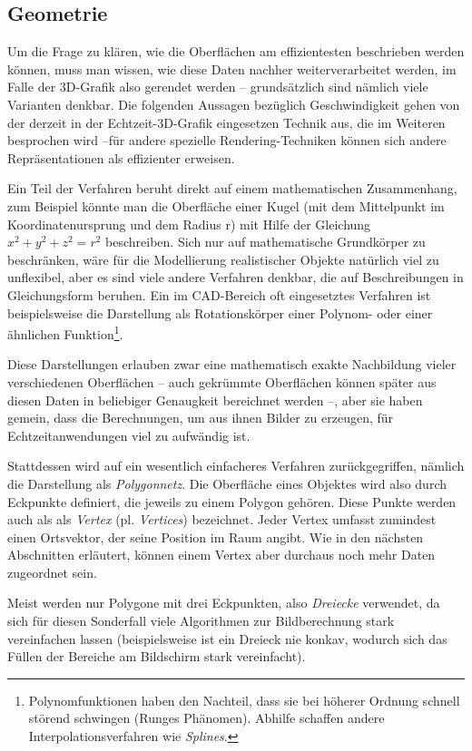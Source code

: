 \subsection{Geometrie}
\label{vertex}
Um die Frage zu klären, wie die Oberflächen am effizientesten beschrieben werden können, muss man wissen, wie diese Daten nachher weiterverarbeitet werden, im Falle der 3D-Grafik also gerendet werden -- grundsätzlich sind nämlich viele Varianten denkbar. Die folgenden Aussagen bezüglich Geschwindigkeit gehen von der derzeit in der Echtzeit-3D-Grafik eingesetzen Technik aus, die im Weiteren besprochen wird --für andere spezielle Rendering-Techniken können sich andere Repräsentationen als effizienter erweisen.

Ein Teil der Verfahren beruht direkt auf einem mathematischen Zusammenhang, zum Beispiel könnte man die Oberfläche einer Kugel (mit dem Mittelpunkt im Koordinatenursprung und dem Radius r) mit Hilfe der Gleichung $x^2 + y^2 + z^2 = r^2$ beschreiben. Sich nur auf mathematische Grundkörper zu beschränken, wäre für die Modellierung realistischer Objekte natürlich viel zu unflexibel, aber es sind viele andere Verfahren denkbar, die auf Beschreibungen in Gleichungsform beruhen. Ein im CAD-Bereich oft eingesetztes Verfahren ist beispielsweise die Darstellung als Rotationskörper einer Polynom- oder einer ähnlichen Funktion\footnote{Polynomfunktionen haben den Nachteil, dass sie bei höherer Ordnung schnell störend schwingen (Runges Phänomen). Abhilfe schaffen andere Interpolationsverfahren wie \emph{Splines}.}.

Diese Darstellungen erlauben zwar eine mathematisch exakte Nachbildung vieler verschiedenen Oberflächen -- auch gekrümmte Oberflächen können später aus diesen Daten in beliebiger Genaugkeit bereichnet werden --, aber sie haben gemein, dass die Berechnungen, um aus ihnen Bilder zu erzeugen, für Echtzeitanwendungen viel zu aufwändig ist.

Stattdessen wird auf ein wesentlich einfacheres Verfahren zurückgegriffen, nämlich die Darstellung als \emph{Polygonnetz}. Die Oberfläche eines Objektes wird also durch Eckpunkte definiert, die jeweils zu einem Polygon gehören. Diese Punkte werden auch als als \emph{Vertex} (pl. \emph{Vertices}) bezeichnet. Jeder Vertex umfasst zumindest einen Ortsvektor, der seine Position im Raum angibt. Wie in den nächsten Abschnitten erläutert, können einem Vertex aber durchaus noch mehr Daten zugeordnet sein.

Meist werden nur Polygone mit drei Eckpunkten, also \emph{Dreiecke} verwendet, da sich für diesen Sonderfall viele Algorithmen zur Bildberechnung stark vereinfachen lassen (beispielsweise ist ein Dreieck nie konkav, wodurch sich das Füllen der Bereiche am Bildschirm stark vereinfacht).

